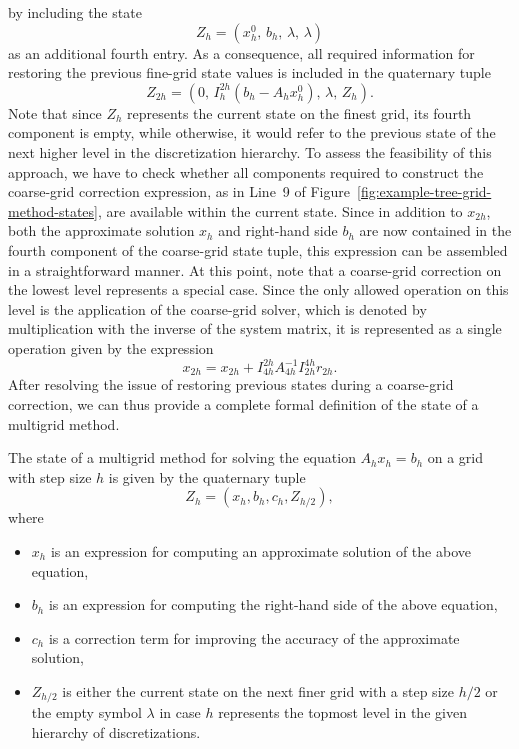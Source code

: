 by including the state 
\begin{equation*}
Z_h = (x_{h}^0, \, b_h, \, \lambda, \, \lambda) 
\end{equation*} 
as an additional fourth entry. 
As a consequence, all required information for restoring the previous fine-grid state values is included in the quaternary tuple 
\begin{equation*}
	Z_{2h} = (0, \, I_{h}^{2h}(b_{h} - A_h x_{h}^0), \, \lambda, \, Z_h).
\end{equation*}
Note that since $Z_h$ represents the current state on the finest grid, its fourth component is empty, while otherwise, it would refer to the previous state of the next higher level in the discretization hierarchy.
To assess the feasibility of this approach, we have to check whether all components required to construct the coarse-grid correction expression, as in Line~9 of Figure~\ref{fig:example-tree-grid-method-states}, are available within the current state.
Since in addition to $x_{2h}$, both the approximate solution $x_h$ and right-hand side $b_h$ are now contained in the fourth component of the coarse-grid state tuple, this expression can be assembled in a straightforward manner.
At this point, note that a coarse-grid correction on the lowest level represents a special case. 
Since the only allowed operation on this level is the application of the coarse-grid solver, which is denoted by multiplication with the inverse of the system matrix, it is represented as a single operation given by the expression 
\begin{equation*}
	x_{2h} = x_{2h} + I_{4h}^{2h} A_{4h}^{-1} I_{2h}^{4h} r_{2h}.
\end{equation*}
After resolving the issue of restoring previous states during a coarse-grid correction, we can thus provide a complete formal definition of the state of a multigrid method.
\begin{definition}
\label{def:multigrid-state}
The state of a multigrid method for solving the equation $A_{h} x_{h} = b_{h}$ on a grid with step size $h$ is given by the quaternary tuple
\begin{equation}
	Z_{h} = \left( x_{h}, b_{h}, c_{h}, Z_{h/2}\right), 
\end{equation}
where
\begin{itemize}
	\item $x_{h}$ is an expression for computing an approximate solution of the above equation,
	\item $b_{h}$ is an expression for computing the right-hand side of the above equation,
	\item $c_{h}$ is a correction term for improving the accuracy of the approximate solution,
	\item $Z_{h/2}$ is either the current state on the next finer grid with a step size $h/2$ or the empty symbol $\lambda$ in case $h$ represents the topmost level in the given hierarchy of discretizations.
\end{itemize}
\end{definition}
